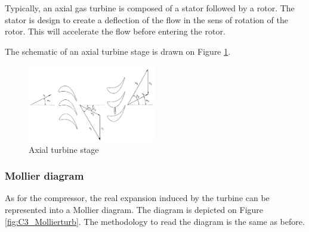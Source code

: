 Typically, an axial gas turbine is composed of a stator followed by a rotor. The stator is design to create a deflection of the flow in the sens of rotation of the rotor. This will accelerate the flow before entering the rotor.

The schematic of an axial turbine stage is drawn on Figure \ref{fig:C3_turbstage}.
\begin{figure}[h]
\centering
\includegraphics[width=0.5\textwidth]{Turb_stage.png}
\caption{Axial turbine stage \citep{Hillewaert2019}}
\label{fig:C3_turbstage}
\end{figure}

\subsubsection{Mollier diagram}
As for the compressor, the real expansion induced by the turbine can be represented into a Mollier diagram. The diagram is depicted on Figure \ref{fig:C3_Mollierturb}. The methodology to read the diagram is the same as before.


